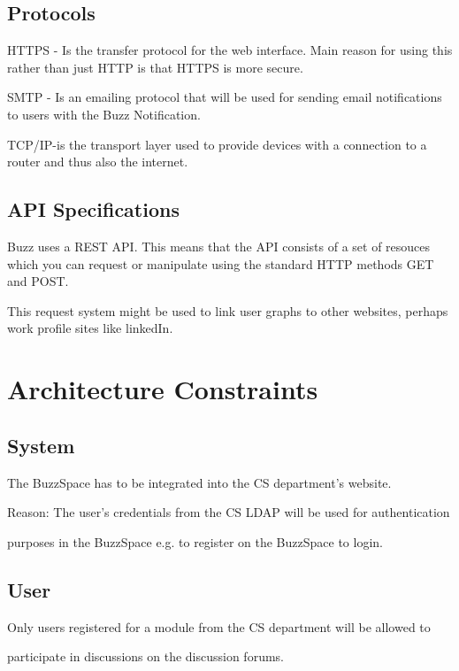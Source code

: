 \documentclass[a4paper,12pt]{report}
\begin{document}
\subsection{Protocols}
\begin{description}
\item HTTPS - Is the transfer protocol for the web interface. Main reason for using this rather than just HTTP is that HTTPS is more secure.
\item SMTP - Is an emailing protocol that will be used for sending email notifications to users with the Buzz Notification.	
\item TCP/IP-is the transport layer used to provide devices with a connection to a router 
	and thus also the internet.
\end{description}
\subsection{API Specifications}
\begin{description}
\item Buzz uses a REST API. This means that the API consists of a set of resouces which you can request or manipulate using the standard HTTP methods GET and POST.
\item This request system might be used to link user graphs to other websites, perhaps work profile sites like linkedIn.
\end{description}

\newpage
\section{Architecture Constraints}

\subsection{System}
	\begin{description}
\item The BuzzSpace has to be integrated into the CS department’s website. 
 \item Reason: The user’s credentials from the CS LDAP will be used for authentication 
\item  purposes in the BuzzSpace e.g. to register on the BuzzSpace to login.
\end{description}

\subsection{User}
	\begin{description}
	\item[$\bullet$] 
Only users registered for a module from the CS department will be allowed to 
\item participate in discussions on the discussion forums.
\end{description}
\end{document}
